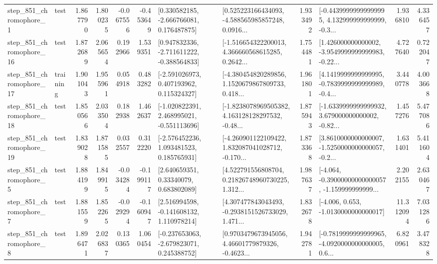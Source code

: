 \begin{tabular}{llrrrrllrlrr}
   step\_851\_chromophore\_1 &      test &      1.867790 &    1.800235 &     -0.067556 & -0.453649 &    [0.330582185, -2.666766081, 0.176487875] &  [0.525223166434093, -4.588565985857248, 0.0916... &       1.933492 &  [-0.44399999999999995, 4.132999999999999, -0.3... &            1.936810 &          4.336457 \\
  step\_851\_chromophore\_16 &      test &      1.872689 &    2.065654 &      0.192966 &  1.539351 &   [0.947832336, -2.711611222, -0.388564833] &  [-1.516654322200013, 4.366660568615285, 0.2642... &       1.754481 &  [1.426000000000002, -3.9549999999999983, -0.22... &            4.727640 &          0.722047 \\
  step\_851\_chromophore\_17 &  training &      1.901043 &    1.955961 &      0.054918 &  0.483282 &    [-2.591026973, 0.407193962, 0.115324327] &  [-4.380454820289856, 1.1520679867809733, 0.418... &       1.961801 &  [4.1419999999999995, -0.7839999999999989, -0.4... &            3.440778 &          4.003668 \\
  step\_851\_chromophore\_18 &      test &      1.850566 &    2.033504 &      0.182938 &  1.462637 &   [-1.020822391, 2.468995021, -0.551113696] &  [-1.8238078969505382, 4.163128128297532, -0.48... &       1.875943 &  [-1.6339999999999932, 3.679000000000002, -0.82... &            1.457276 &          5.477086 \\
  step\_851\_chromophore\_19 &      test &      1.839028 &    1.871585 &      0.032557 &  0.312220 &    [-2.576452236, 1.093481523, 0.185765931] &  [-4.260901122109422, 1.832087041028712, -0.170... &       1.873368 &  [3.8610000000000007, -1.5250000000000057, -0.2... &            1.631401 &          5.411604 \\
   step\_851\_chromophore\_5 &      test &      1.884199 &    1.849915 &     -0.034284 & -0.199117 &      [2.640659351, 0.33340079, 0.683802089] &  [4.522791556808704, 0.21826748960730225, 1.312... &       1.987637 &  [-4.064, -0.39000000000000057, -1.159999999999... &            2.202155 &          2.630467 \\
   step\_851\_chromophore\_7 &      test &      1.881559 &    1.852265 &     -0.029294 & -0.160947 &    [2.516994598, -0.141608132, 1.110978214] &  [4.307477843043493, -0.2938151526733029, 1.471... &       1.832678 &               [-4.006, 0.653, -1.0130000000000017] &           11.312094 &          7.031286 \\
   step\_851\_chromophore\_8 &      test &      1.896471 &    2.026837 &      0.130365 &  1.060454 &   [-0.237653063, -2.679823071, 0.245388752] &  [0.9703479673945056, 4.46601779879326, -0.4623... &       1.942781 &  [-0.7819999999999965, -4.0920000000000005, 0.6... &            6.820961 &          3.478328 \\

\end{tabular}
